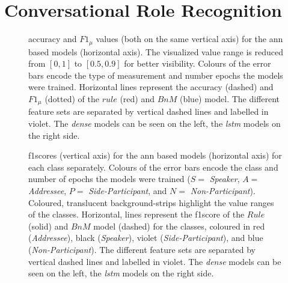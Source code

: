 \chapter{Conversational Role Recognition}

\vspace{-20pt}
\begin{figure}[!ht]
    \centering
    \begin{footnotesize}
    
    \end{footnotesize}
    \caption[Overall performance of all ANN models.]{\label{app:role-nn-acc} 
    \Gls{accuracy} and \(F1_\mu\) values (both on the same vertical axis) for the \gls{ann} based models (horizontal axis).
    The visualized value range is reduced from \([0,1]\) to \([0.5,0.9]\) for better visibility.
    Colours of the error bars encode the type of measurement and number epochs the models were trained.
    Horizontal lines represent the \gls{accuracy} (dashed) and \(F1_\mu\) (dotted) of the \(rule\) (red) and \(BnM\) (blue) model.
    The different feature sets are separated by vertical dashed lines and labelled in violet.
    The \emph{dense} models can be seen on the left, the \emph{lstm} models on the right side.
    }
\end{figure}

\begin{figure}[!ht]
    \centering
    \begin{footnotesize}
    
    \end{footnotesize}
    \caption[Class-wise performance of all ANN models.]{\label{app:role-nn-f1-class} 
    \Glspl{f1score} (vertical axis) for the \gls{ann} based models (horizontal axis) for each class separately.
    Colours of the error bars encode the class and number of epochs the models were trained (\(S=\) \emph{Speaker}, \(A=\) \emph{Addressee}, \(P=\) \emph{Side-Participant}, and \(N=\) \emph{Non-Participant}).
    Coloured, translucent background-strips highlight the value ranges of the classes.
    Horizontal, lines represent the \gls{f1score} of the \(Rule\) (solid) and \(BnM\) model (dashed) for the classes, coloured in red (\emph{Addressee}), black (\emph{Speaker}), violet (\emph{Side-Participant}), and blue (\emph{Non-Participant}).
    The different feature sets are separated by vertical dashed lines and labelled in violet.
    The \emph{dense} models can be seen on the left, the \emph{lstm} models on the right side.
    }
\end{figure}

